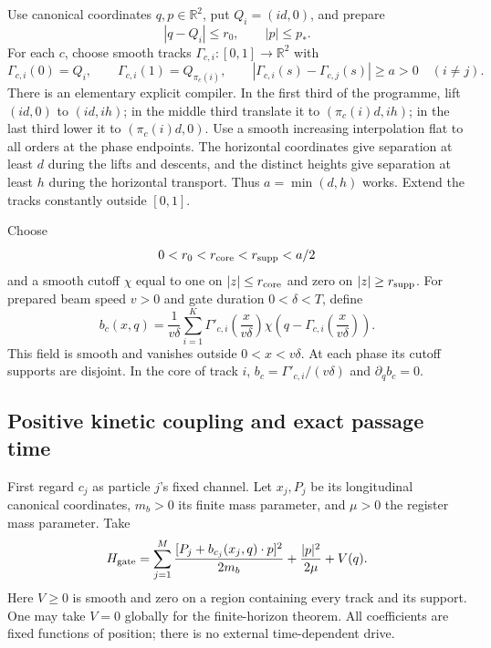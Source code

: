 \documentclass[11pt]{article}
\theoremstyle{definition}\newtheorem{definition}[theorem]{Definition}
\theoremstyle{remark}\newtheorem{remark}[theorem]{Remark}
\begin{document}
Use canonical coordinates $q,p\in\mathbb R^2$, put $Q_i=(id,0)$, and prepare
\begin{equation}\label{mech:cells}
 |q-Q_i|\le r_0,\qquad |p|\le p_*.
\end{equation}
For each $c$, choose smooth tracks $\Gamma_{c,i}:[0,1]\to\mathbb R^2$ with
\begin{equation}\label{mech:tracks}
 \Gamma_{c,i}(0)=Q_i,\qquad
 \Gamma_{c,i}(1)=Q_{\pi_c(i)},\qquad
 |\Gamma_{c,i}(s)-\Gamma_{c,j}(s)|\ge a>0\quad(i\ne j).
\end{equation}
There is an elementary explicit compiler. In the first third of the programme,
lift $(id,0)$ to $(id,ih)$; in the middle third translate it to
$(\pi_c(i)d,ih)$; in the last third lower it to $(\pi_c(i)d,0)$.
Use a smooth increasing interpolation flat to all orders at the phase endpoints.
The horizontal coordinates give separation at least $d$ during the lifts and
descents, and the distinct heights give separation at least $h$ during the
horizontal transport. Thus $a=\min(d,h)$ works. Extend the tracks constantly
outside $[0,1]$.

Choose
\[
 0<r_0<r_{\rm core}<r_{\rm supp}<a/2
\]
and a smooth cutoff $\chi$ equal to one on $|z|\le r_{\rm core}$ and zero on
$|z|\ge r_{\rm supp}$. For prepared beam speed $v>0$ and gate duration
$0<\delta<T$, define
\begin{equation}\label{mech:field}
 b_c(x,q)=\frac1{v\delta}\sum_{i=1}^K
 \Gamma'_{c,i}\!\left(\frac{x}{v\delta}\right)
 \chi\!\left(q-\Gamma_{c,i}\!\left(\frac{x}{v\delta}\right)\right).
\end{equation}
This field is smooth and vanishes outside $0<x<v\delta$. At each phase its
cutoff supports are disjoint. In the core of track $i$,
$b_c=\Gamma'_{c,i}/(v\delta)$ and $\partial_qb_c=0$.

\subsection{Positive kinetic coupling and exact passage time}

First regard $c_j$ as particle $j$'s fixed channel. Let $x_j,P_j$ be its
longitudinal canonical coordinates, $m_b>0$ its finite mass parameter, and
$\mu>0$ the register mass parameter. Take
\begin{equation}\label{mech:H}
 H_{\rm gate}=
 \sum_{j=1}^M\frac{[P_j+b_{c_j}(x_j,q)\cdot p]^2}{2m_b}
 +\frac{|p|^2}{2\mu}+V(q).
\end{equation}
Here $V\ge0$ is smooth and zero on a region containing every track and its
support. One may take $V=0$ globally for the finite-horizon theorem.
All coefficients are fixed functions of position; there is no external
time-dependent drive.
\end{document}

